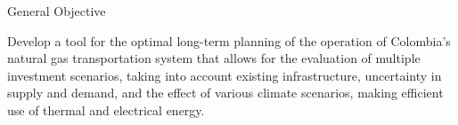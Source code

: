 \documentclass[aspectratio=169,12pt]{beamer}
\begin{document}
\frame{\titlepage}

\begin{frame}{General Objective}
	\begin{block}{}
		Develop a tool for the optimal long-term planning of the operation of Colombia's natural gas transportation system that allows for the evaluation of multiple investment scenarios, taking into account existing infrastructure, uncertainty in supply and demand, and the effect of various climate scenarios, making efficient use of thermal and electrical energy.
	\end{block}
\end{frame}
	
\end{document}
